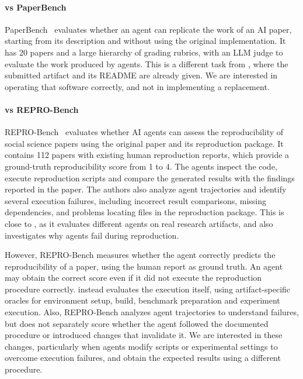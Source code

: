 \paragraph{\aebench vs PaperBench}
PaperBench~\cite{starace-icml25} evaluates whether an agent can replicate the work of
  an AI paper, starting from its description and without using the original
  implementation.
It has 20 papers and a large hierarchy of grading rubrics, with an LLM judge to
  evaluate the work produced by agents.
This is a different task from \aebench, where the submitted artifact and its README
  are already given.
We are interested in operating that software correctly, and not in implementing a
  replacement.

\paragraph{\aebench vs REPRO-Bench}

REPRO-Bench~\cite{hu-acl25} evaluates whether AI agents can assess the
  reproducibility of social science papers using the original paper and
  its reproduction package.
It contains 112 papers with existing human reproduction reports, which
  provide a ground-truth reproducibility score from 1 to 4.
The agents inspect the code, execute reproduction scripts and compare
  the generated results with the findings reported in the paper.
The authors also analyze agent trajectories and identify several execution
  failures, including incorrect result comparisons, missing dependencies,
  and problems locating files in the reproduction package.
This is close to \aebench, as it evaluates different agents on real
  research artifacts, and also investigates why agents fail during
  reproduction.

However, REPRO-Bench measures whether the agent correctly predicts the
  reproducibility of a paper, using the human report as ground truth.
An agent may obtain the correct score even if it did not execute the
  reproduction procedure correctly.
\aebench instead evaluates the execution itself, using artifact-specific
  oracles for environment setup, build, benchmark preparation and
  experiment execution.
Also, REPRO-Bench analyzes agent trajectories to understand failures,
  but does not separately score whether the agent followed the
  documented procedure or introduced changes that invalidate it.
We are interested in these changes, particularly when agents modify
  scripts or experimental settings to overcome execution failures,
  and obtain the expected results using a different procedure.

